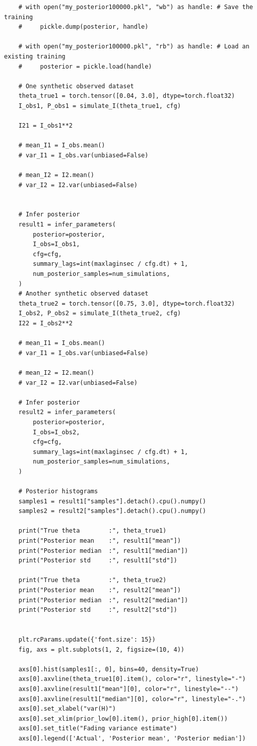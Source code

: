 \documentclass{article}
\begin{document}
\begin{verbatim}
    # with open("my_posterior100000.pkl", "wb") as handle: # Save the training
    #     pickle.dump(posterior, handle)

    # with open("my_posterior100000.pkl", "rb") as handle: # Load an existing training
    #     posterior = pickle.load(handle)
    
    # One synthetic observed dataset
    theta_true1 = torch.tensor([0.04, 3.0], dtype=torch.float32)
    I_obs1, P_obs1 = simulate_I(theta_true1, cfg)

    I21 = I_obs1**2

    # mean_I1 = I_obs.mean()
    # var_I1 = I_obs.var(unbiased=False)

    # mean_I2 = I2.mean()
    # var_I2 = I2.var(unbiased=False)  
    

    # Infer posterior
    result1 = infer_parameters(
        posterior=posterior,
        I_obs=I_obs1,
        cfg=cfg,
        summary_lags=int(maxlaginsec / cfg.dt) + 1,
        num_posterior_samples=num_simulations,
    )
    # Another synthetic observed dataset
    theta_true2 = torch.tensor([0.75, 3.0], dtype=torch.float32)
    I_obs2, P_obs2 = simulate_I(theta_true2, cfg)
    I22 = I_obs2**2

    # mean_I1 = I_obs.mean()
    # var_I1 = I_obs.var(unbiased=False)

    # mean_I2 = I2.mean()
    # var_I2 = I2.var(unbiased=False)    

    # Infer posterior
    result2 = infer_parameters(
        posterior=posterior,
        I_obs=I_obs2,
        cfg=cfg,
        summary_lags=int(maxlaginsec / cfg.dt) + 1,
        num_posterior_samples=num_simulations,
    )

    # Posterior histograms
    samples1 = result1["samples"].detach().cpu().numpy()
    samples2 = result2["samples"].detach().cpu().numpy()

    print("True theta        :", theta_true1)
    print("Posterior mean    :", result1["mean"])
    print("Posterior median  :", result1["median"])
    print("Posterior std     :", result1["std"])

    print("True theta        :", theta_true2)
    print("Posterior mean    :", result2["mean"])
    print("Posterior median  :", result2["median"])
    print("Posterior std     :", result2["std"])


    plt.rcParams.update({'font.size': 15})
    fig, axs = plt.subplots(1, 2, figsize=(10, 4))

    axs[0].hist(samples1[:, 0], bins=40, density=True)
    axs[0].axvline(theta_true1[0].item(), color="r", linestyle="-")
    axs[0].axvline(result1["mean"][0], color="r", linestyle="--")
    axs[0].axvline(result1["median"][0], color="r", linestyle="-.")
    axs[0].set_xlabel("var(H)")
    axs[0].set_xlim(prior_low[0].item(), prior_high[0].item())
    axs[0].set_title("Fading variance estimate")
    axs[0].legend(['Actual', 'Posterior mean', 'Posterior median'])


\end{verbatim}
\end{document}
